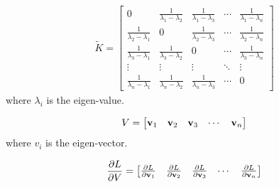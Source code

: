 	\begin{equation}
	\begin{aligned}
	\tilde{K} = 
	\begin{bmatrix}
	0  &\frac{1}{\lambda_{1} - \lambda_{2}} &\frac{1}{\lambda_{1} - \lambda_{3}} &\cdots &\frac{1}{\lambda_{1} - \lambda_{n}}\\
	\frac{1}{\lambda_{2} - \lambda_{1}} &0 &\frac{1}{\lambda_{2} - \lambda_{3}} &\cdots &\frac{1}{\lambda_{2} - \lambda_{n}}\\
	\frac{1}{\lambda_{3} - \lambda_{1}} &\frac{1}{\lambda_{3} - \lambda_{2}} &0 &\cdots &\frac{1}{\lambda_{3} - \lambda_{n}}\\
	\vdots &\vdots &\vdots &\ddots &\vdots\\
	\frac{1}{\lambda_{n} - \lambda_{1}} &\frac{1}{\lambda_{n} - \lambda_{2}} &\frac{1}{\lambda_{n} - \lambda_{3}} &\cdots &0
	\end{bmatrix}
	\end{aligned}
	\end{equation}
	where $\lambda_{i}$ is the eigen-value.
	
	\begin{equation}
	\begin{aligned}
	V = 
	\begin{bmatrix}
	\mathbf{v}_{1} &\mathbf{v}_{2} &\mathbf{v}_{3} &\cdots &\mathbf{v}_{n}
	\end{bmatrix}
	\end{aligned}
	\end{equation}
	where $v_{i}$ is the eigen-vector.
	
	\begin{equation}
	\begin{aligned}
	\frac{\partial L}{\partial V} = 
	\begin{bmatrix}
	\frac{\partial L}{\partial \mathbf{v}_{1}} &\frac{\partial L}{\partial \mathbf{v}_{2}}  &\frac{\partial L}{\partial \mathbf{v}_{3}}  &\cdots &\frac{\partial L}{\partial \mathbf{v}_{n}} \\
	\end{bmatrix}
	\end{aligned}
	\end{equation}
	

